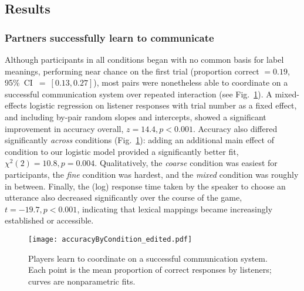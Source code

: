 \subsection{Results}

\subsubsection{Partners successfully learn to communicate}

Although participants in all conditions began with no common basis for label meanings, performing near chance on the first trial (proportion correct $= 0.19$, 95\%~CI~$=~[0.13, 0.27]$), most pairs were nonetheless able to coordinate on a successful communication system over repeated interaction (see Fig.\ \ref{fig:accuracy}). 
A mixed-effects logistic regression on listener responses with trial number as a fixed effect, and including by-pair random slopes and intercepts, showed a significant improvement in accuracy overall, $z = 14.4, p < 0.001$. 
Accuracy also differed significantly \emph{across} conditions (Fig.\ \ref{fig:accuracy}): adding an additional main effect of condition to our logistic model provided a significantly better fit, $\chi^2(2) = 10.8, p = 0.004$. 
Qualitatively, the \emph{coarse} condition was easiest for participants, the \emph{fine} condition was hardest, and the \emph{mixed} condition was roughly in between. %
Finally, the (log) response time taken by the speaker to choose an utterance also decreased significantly over the course of the game, $t = -19.7, p < 0.001$, indicating that lexical mappings became increasingly established or accessible.

\begin{figure}[t]
\begin{center}
{\texttt{[image: accuracyByCondition\_edited.pdf]}}
\vspace{-2ex}
{\caption{{Players learn to coordinate on a successful communication system. Each point is the mean proportion of correct responses by listeners; curves are nonparametric fits.  %
\label{fig:accuracy}}}}
\vspace{-3ex}
\end{center}
\end{figure}

